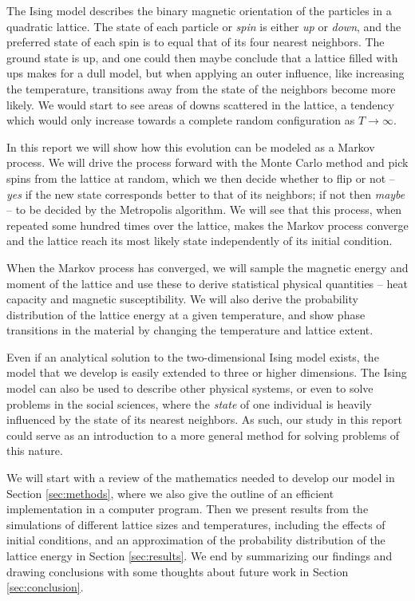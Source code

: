 \documentclass[]{article}
\begin{document}
The Ising model describes the binary magnetic orientation of the particles in a quadratic lattice. The state of each particle or \textit{spin} is either \textit{up} or \textit{down}, and the preferred state of each spin is to equal that of its four nearest neighbors. The ground state is up, and one could then maybe conclude that a lattice filled with ups makes for a dull model, but when applying an outer influence, like increasing the temperature, transitions away from the state of the neighbors become more likely. We would start to see areas of downs scattered in the lattice, a tendency which would only increase towards a complete random configuration as $T \rightarrow \infty$. 

In this report we will show how this evolution can be modeled as a Markov process. We will drive the process forward with the Monte Carlo method and pick spins from the lattice at random, which we then decide whether to flip or not -- \textit{yes} if the new state corresponds better to that of its neighbors; if not then \textit{maybe} -- to be decided by the Metropolis algorithm. We will see that this process, when repeated some hundred times over the lattice, makes the Markov process converge and the lattice reach its most likely state independently of its initial condition.

When the Markov process has converged, we will sample the magnetic energy and moment of the lattice and use these to derive statistical physical quantities -- heat capacity and magnetic susceptibility. We will also derive the probability distribution of the lattice energy at a given temperature, and show phase transitions in the material by changing the temperature and lattice extent. 

Even if an analytical solution to the two-dimensional Ising model exists, the model that we develop is easily extended to three or higher dimensions. The Ising model can also be used to describe other physical systems, or even to solve problems in the social sciences, where the \textit{state} of one individual is heavily influenced by the state of its nearest neighbors. As such, our study in this report could serve as an introduction to a more general method for solving problems of this nature.

We will start with a review of the mathematics needed to develop our model in Section \ref{sec:methods}, where we also give the outline of an efficient implementation in a computer program. Then we present results from the simulations of different lattice sizes and temperatures, including the effects of initial conditions, and an approximation of the probability distribution of the lattice energy in Section \ref{sec:results}. We end by summarizing our findings and drawing conclusions with some thoughts about future work in Section \ref{sec:conclusion}.
\end{document}
